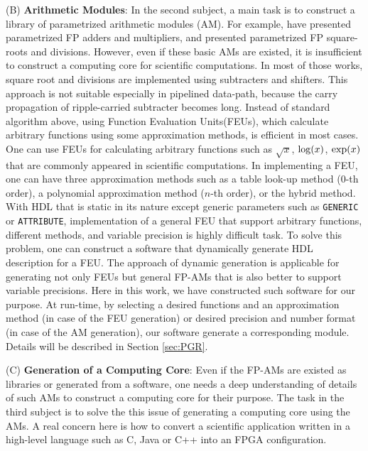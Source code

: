 \documentclass{article}
\begin{document}
(B) {\bf Arithmetic Modules}:
In the second subject, a main task is to construct a library
of parametrized arithmetic modules (AM). 
For example, \cite{JL01}\cite{LCCN04} have presented parametrized FP adders and
multipliers, and \cite{LKM02}\cite{WN04} presented parametrized FP square-roots and divisions. 
However, even if these basic AMs are existed, 
it is insufficient to construct a computing core for scientific computations.
In most of those works, square root and divisions are implemented
using subtracters and shifters. 
This approach is not suitable especially in pipelined data-path,
because the carry propagation of ripple-carried subtracter becomes long.
Instead of standard algorithm above, 
using Function Evaluation Units(FEUs), which calculate arbitrary functions using some approximation methods,
is efficient in most cases.
One can use FEUs for calculating arbitrary functions such as
$\sqrt{x}$, ${\rm log}(x)$, ${\rm exp}(x)$ that are commonly appeared in 
scientific computations.
In implementing a FEU, one can have three approximation methods such as
a table look-up method ($0$-th order), a polynomial approximation method ($n$-th order),
or the hybrid method\cite{FO01}\cite{M97}. 
With HDL that is static in its nature except generic parameters
such as \verb|GENERIC| or \verb|ATTRIBUTE|,
implementation of a general FEU that support arbitrary functions, 
different methods, and variable precision is highly difficult task.
To solve this problem, one can construct a software that dynamically generate 
HDL description for a FEU.
The approach of dynamic generation is applicable for generating
not only FEUs but general FP-AMs that is also
better to support variable precisions.
Here in this work, we have constructed such software for our purpose.
At run-time, by selecting a desired functions and an approximation method
(in case of the FEU generation) or desired precision and number format
(in case of the AM generation), our software generate a corresponding module.
Details will be described in Section \ref{sec:PGR}.

(C) {\bf Generation of a Computing Core}:
Even if the FP-AMs are existed as libraries or generated
from a software, one needs a deep understanding of details of such AMs
to construct a computing core for their purpose.
The task in the third subject is to solve the this issue
of generating a computing core using the AMs.
A real concern here is how to convert a scientific application
written in a high-level language such as C, Java or C++ into an FPGA configuration.
\end{document}
